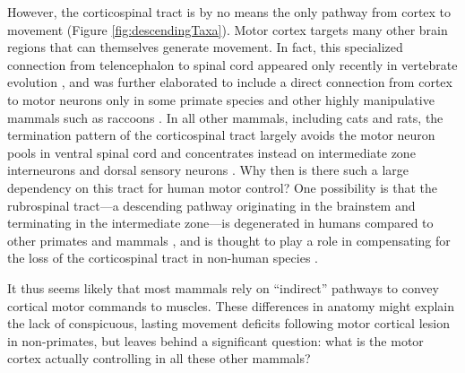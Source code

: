 However, the corticospinal tract is by no means the only pathway from cortex to movement (Figure \ref{fig:descendingTaxa}). Motor cortex targets many other brain regions that can themselves generate movement. In fact, this specialized connection from telencephalon to spinal cord appeared only recently in vertebrate evolution \cite{TenDonkelaar2009}, and was further elaborated to include a direct connection from cortex to motor neurons only in some primate species and other highly manipulative mammals such as raccoons \cite{Heffner1983}. In all other mammals, including cats and rats, the termination pattern of the corticospinal tract largely avoids the motor neuron pools in ventral spinal cord and concentrates instead on intermediate zone interneurons and dorsal sensory neurons \cite{Kuypers1981,Yang2003}. Why then is there such a large dependency on this tract for human motor control? One possibility is that the rubrospinal tract---a descending pathway originating in the brainstem and terminating in the intermediate zone---is degenerated in humans compared to other primates and mammals \cite{Nathan1955,Nathan1982}, and is thought to play a role in compensating for the loss of the corticospinal tract in non-human species \cite{Lawrence1968a,Zaaimi2012}.

It thus seems likely that most mammals rely on ``indirect'' pathways to convey cortical motor commands to muscles. These differences in anatomy might explain the lack of conspicuous, lasting movement deficits following motor cortical lesion in non-primates, but leaves behind a significant question: what is the motor cortex actually controlling in all these other mammals?

